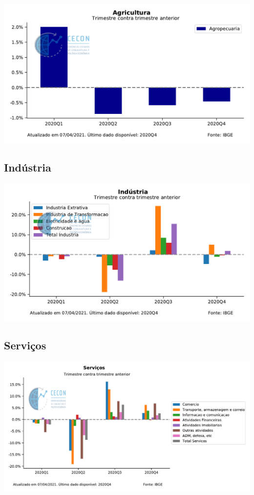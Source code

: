 \documentclass{SelfArx}
\begin{document}
\begin{center}
\includegraphics[width=.9\linewidth]{./figs/PIB/Agropecuaria.pdf}
\end{center}

\subsection*{Indústria}
\label{sec:org87c9e11}

\begin{center}
\includegraphics[width=.9\linewidth]{./figs/PIB/Industria.pdf}
\end{center}


\subsection*{Serviços}
\label{sec:org2fd4ec2}

\begin{center}
\includegraphics[width=.9\linewidth]{./figs/PIB/Servicos.pdf}
\end{center}
\end{document}
